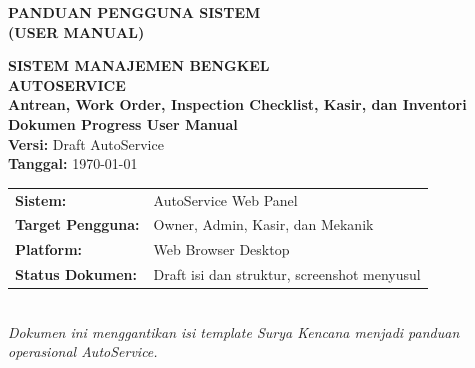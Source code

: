 \documentclass[12pt,a4paper]{report}
\begin{document}
\begin{titlepage}
    \centering
    \vspace*{1cm}

    {\Huge \textbf{PANDUAN PENGGUNA SISTEM}}\\[0.5cm]
    {\LARGE \textbf{(USER MANUAL)}}\\[1.5cm]

    \vspace{1cm}

    {\Large \textbf{SISTEM MANAJEMEN BENGKEL}}\\[0.5cm]
    {\Huge \textbf{AUTOSERVICE}}\\[0.2cm]
    {\Large \textbf{Antrean, Work Order, Inspection Checklist, Kasir, dan Inventori}}\\[2cm]

    \textbf{Dokumen Progress User Manual}\\[0.3cm]
    \textbf{Versi:} Draft AutoService\\
    \textbf{Tanggal:} \today\\[1.5cm]

    \begin{tabular}{ll}
        \textbf{Sistem:} & AutoService Web Panel \\
        \textbf{Target Pengguna:} & Owner, Admin, Kasir, dan Mekanik \\
        \textbf{Platform:} & Web Browser Desktop \\
        \textbf{Status Dokumen:} & Draft isi dan struktur, screenshot menyusul \\
    \end{tabular}\\[2cm]

    \vfill
    \textit{Dokumen ini menggantikan isi template Surya Kencana menjadi panduan operasional AutoService.}

\end{titlepage}

\clearpage
\tableofcontents
\clearpage
\listoffigures
\clearpage

\end{document}
